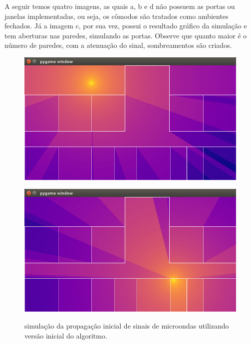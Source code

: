 \documentclass[
	12pt,				%
	openright,			%
	twoside,			%
	a4paper,			%
	english,			%
	french,				%
	spanish,			%
	brazil				%
	]{abntex2}
\begin{document}
A seguir temos quatro imagens, as quais a, b e d não possuem as portas ou janelas implementadas, ou seja, os cômodos são tratados como ambientes fechados. Já a imagem c, por sua vez, possui o resultado gráfico da simulação e tem aberturas nas paredes, simulando as portas. Observe que quanto maior é o número de paredes, com a atenuação do sinal, sombreamentos são criados.

\begin{figure}[htb]
	\label{capturas}
	\caption{simulação da propagação inicial de sinais de microondas utilizando versão inicial do algoritmo.}
	\centering
	\begin{minipage}{0.4\textwidth}
		\centering \label{captura_1}
		\includegraphics[scale=0.3]{images/captura-1.jpg}
	\end{minipage}
	\hfill
	\begin{minipage}{0.4\textwidth}
		\centering \label{captura_2}
		\includegraphics[scale=0.3]{images/captura-2.jpg}
	\end{minipage}
	\hfill
	\begin{minipage}{0.4\textwidth}

\end{minipage}
\end{figure}
\end{document}
